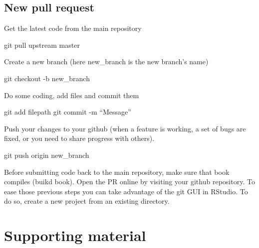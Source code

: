 \documentclass[
  oneside]{book}
\newenvironment{Shaded}{\begin{snugshade}}{\end{snugshade}}
\newcommand{\FunctionTok}[1]{\textcolor[rgb]{0.00,0.00,0.00}{#1}}
\newcommand{\NormalTok}[1]{#1}
\begin{document}
\hypertarget{new-pull-request}{%
\section*{New pull request}\label{new-pull-request}}

Get the latest code from the main repository

\begin{Shaded}
\begin{Highlighting}[]
\FunctionTok{git}\NormalTok{ pull upstream master}
\end{Highlighting}
\end{Shaded}

Create a new branch (here new\_branch is the new branch's name)

\begin{Shaded}
\begin{Highlighting}[]
\FunctionTok{git}\NormalTok{ checkout {-}b new\_branch}
\end{Highlighting}
\end{Shaded}

Do some coding, add files and commit them

\begin{Shaded}
\begin{Highlighting}[]
\FunctionTok{git}\NormalTok{ add filepath}
\FunctionTok{git}\NormalTok{ commit {-}m “Message”}
\end{Highlighting}
\end{Shaded}

Push your changes to your github (when a feature is working, a set of bugs are fixed, or you need to share progress with others).

\begin{Shaded}
\begin{Highlighting}[]
\FunctionTok{git}\NormalTok{ push origin new\_branch}
\end{Highlighting}
\end{Shaded}

Before submitting code back to the main repository, make sure that book compiles (buikd book). Open the PR online by visiting your github repository. To ease those previous steps you can take advantage of the git GUI in RStudio. To do so, create a new project from an existing directory.

\hypertarget{supporting-material}{%
\chapter*{Supporting material}\label{supporting-material}}
\end{document}
